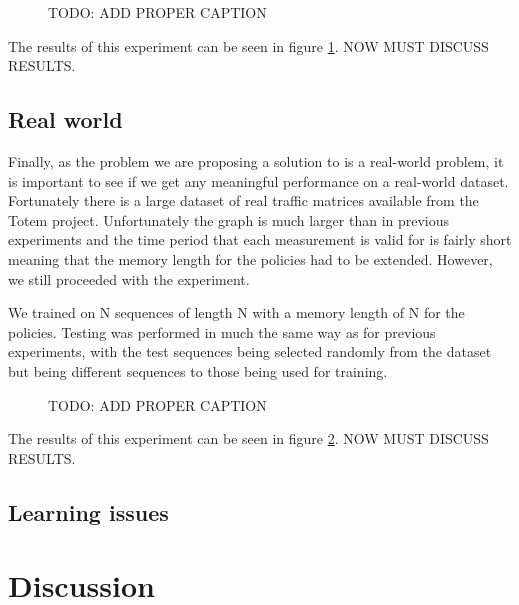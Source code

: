 \begin{figure}
    \centering
    
    \caption{TODO: ADD PROPER CAPTION}
    \label{fig:exp_graphs}
\end{figure}

The results of this experiment can be seen in figure \ref{fig:exp_graphs}. NOW MUST DISCUSS RESULTS.

\subsection{Real world}
Finally, as the problem we are proposing a solution to is a real-world problem, it is important to see if we get any meaningful performance on a real-world dataset. Fortunately there is a large dataset of real traffic matrices available from the Totem\cite{uhlig2006providing} project. Unfortunately the graph is much larger than in previous experiments and the time period that each measurement is valid for is fairly short meaning that the memory length for the policies had to be extended. However, we still proceeded with the experiment.

We trained on N sequences of length N with a memory length of N for the policies. Testing was performed in much the same way as for previous experiments, with the test sequences being selected randomly from the dataset but being different sequences to those being used for training.

\begin{figure}
    \centering
%    
    \caption{TODO: ADD PROPER CAPTION}
    \label{fig:exp_real}
\end{figure}

The results of this experiment can be seen in figure \ref{fig:exp_real}. NOW MUST DISCUSS RESULTS.


\subsection{Learning issues}

\section{Discussion}

